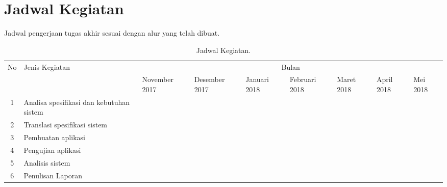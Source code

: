 \section{Jadwal Kegiatan}

Jadwal pengerjaan tugas akhir sesuai dengan alur yang telah dibuat.

\begin{table}[H]
	\caption{Jadwal Kegiatan.}
	
	\begin{center}
		\resizebox{\textwidth}{!}
		{\begin{tabular}{|c|p{5cm}|p{2cm}|p{2cm}|p{2cm}|p{2cm}|p{2cm}|p{2cm}|p{2cm}|}
				\hline 
				\multirow{2}{*}{No} & \multirow{2}{*}{Jenis Kegiatan} & \multicolumn{7}{c|}{Bulan}
				\tabularnewline
				
				\cline{3-9} 
				&  & November 2017 & Desember 2017 & Januari 2018 & Februari 2018 & Maret 2018 & April 2018 & Mei 2018
				\tabularnewline
				
				\hline 
				1 & Analisa spesifikasi dan kebutuhan sistem & \cellcolor{cyan} & \cellcolor{cyan} &  &  &  &  & \tabularnewline
				
				\hline 
				2 & Translasi spesifikasi sistem &  & \cellcolor{red} &  &  &  &  & \tabularnewline
				
				\hline 
				3 & Pembuatan aplikasi &&  
				\cellcolor{green} & \cellcolor{green} & \cellcolor{green} & \cellcolor{green} &  & \tabularnewline
				
				\hline 
				4 & Pengujian aplikasi &  &  &  &  & \cellcolor{darkgray} & \cellcolor{darkgray} & \tabularnewline
				
				\hline 
				5 & Analisis sistem &  &  &  &  &  & \cellcolor{lightgray} & \cellcolor{lightgray} \tabularnewline
				
				\hline 
				6 & Penulisan Laporan & \cellcolor{yellow} & \cellcolor{yellow} & \cellcolor{yellow} & \cellcolor{yellow} & \cellcolor{yellow} & \cellcolor{yellow} & \cellcolor{yellow} 
				\tabularnewline
				
				\hline 
		\end{tabular}}
		\par\end{center}
\end{table}